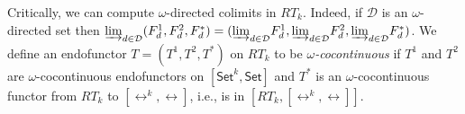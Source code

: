 \documentclass{lmcs}
\theoremstyle{plain}\newtheorem{satz}[thm]{Satz}
\newcommand{\cal}{\mathcal}
\newcommand{\set}{\mathsf{Set}}
\begin{document}
\vspace*{0.1in}
Critically, we can compute $\omega$-directed colimits in
$RT_k$. Indeed, if $\cal D$ is an $\omega$-directed set then
$\colim{d \in {\cal D}}{(F^1_d, F^2_d,F^*_d)} = (\colim{d \in {\cal
    D}}{F^1_d}, \colim{d \in {\cal D}}{F^2_d}, \colim{d \in {\cal
    D}}{F^*_d})$.  We define an endofunctor $T = (T^1,T^2,T^*)$ on
$RT_k$ to be {\em $\omega$-cocontinuous} if $T^1$ and $T^2$ are
$\omega$-cocontinuous endofunctors on $[\set^k,\set]$ and $T^*$ is an
$\omega$-cocontinuous functor from $RT_k$ to $[\rel^k,\rel]$, i.e., is
in $[RT_k,[\rel^k,\rel]]$.
%
\end{document}
